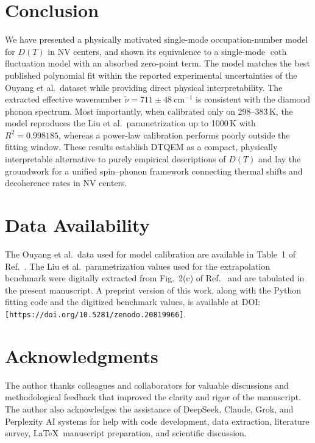 \documentclass[12pt,a4paper]{article}
\begin{document}
\section{Conclusion}

We have presented a physically motivated single-mode occupation-number
model for $D(T)$ in NV centers, and shown its equivalence to a
single-mode $\coth$ fluctuation model with an absorbed zero-point term.
The model matches the best published polynomial fit within the reported
experimental uncertainties of the Ouyang et al.\ dataset while providing
direct physical interpretability.
The extracted effective wavenumber
$\tilde{\nu} = 711 \pm 48\ \mathrm{cm}^{-1}$ is consistent with the
diamond phonon spectrum.
Most importantly, when calibrated only on 298--383\,K, the model
reproduces the Liu et al.\ parametrization up to 1000\,K with
$R^2 = 0.998185$, whereas a power-law calibration performs poorly
outside the fitting window.
These results establish DTQEM as a compact, physically interpretable
alternative to purely empirical descriptions of $D(T)$ and lay the
groundwork for a unified spin--phonon framework connecting thermal
shifts and decoherence rates in NV centers.

\section*{Data Availability}

The Ouyang et al.\ data used for model calibration are available in
Table~1 of Ref.~\cite{Ouyang2024}.
The Liu et al.\ parametrization values used for the extrapolation
benchmark were digitally extracted from Fig.~2(c) of Ref.~\cite{Liu2019}
and are tabulated in the present manuscript.
A preprint version of this work, along with the Python fitting code
and the digitized benchmark values, is available at
DOI: \texttt{[https://doi.org/10.5281/zenodo.20819966]}.

\section*{Acknowledgments}

The author thanks colleagues and collaborators for valuable discussions
and methodological feedback that improved the clarity and rigor of the
manuscript.
The author also acknowledges the assistance of DeepSeek, Claude, Grok,
and Perplexity AI systems for help with code development, data extraction,
literature survey, \LaTeX\ manuscript preparation, and scientific
discussion.
\end{document}
